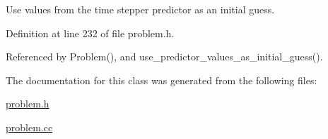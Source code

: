 Use values from the time stepper predictor as an initial guess. 



Definition at line 232 of file problem.\+h.



Referenced by Problem(), and use\+\_\+predictor\+\_\+values\+\_\+as\+\_\+initial\+\_\+guess().



The documentation for this class was generated from the following files\+:\begin{DoxyCompactItemize}
\item 
\hyperlink{problem_8h}{problem.\+h}\item 
\hyperlink{problem_8cc}{problem.\+cc}\end{DoxyCompactItemize}
